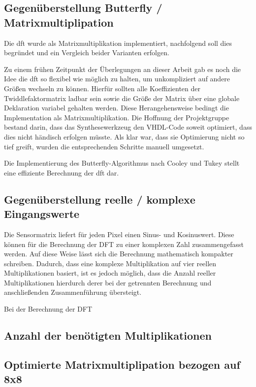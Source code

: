   \subsection{Gegenüberstellung Butterfly / Matrixmultiplipation} 
  Die \gls{dft} wurde als Matrixmultiplikation implementiert, nachfolgend soll dies begründet und ein Vergleich beider Varianten erfolgen.
  
  Zu einem frühen Zeitpunkt der Überlegungen 
  an dieser Arbeit gab es noch die Idee die \gls{dft} so flexibel wie möglich zu halten, um unkompliziert auf andere Größen wechseln zu können.
  Hierfür sollten alle Koeffizienten der Twiddlefaktormatrix ladbar sein sowie die Größe der Matrix über eine globale Deklaration variabel gehalten werden.
  Diese Herangehensweise bedingt die Implementation als Matrixmultiplikation. Die Hoffnung der Projektgruppe bestand darin, dass das Synthesewerkzeug den 
  VHDL-Code soweit optimiert, dass dies nicht händisch erfolgen müsste.
  Als klar war, dass sie Optimierung nicht so tief greift, wurden die entsprechenden Schritte manuell umgesetzt. 
  
  Die Implementierung des Butterfly-Algorithmus nach Cooley und Tukey stellt eine effiziente Berechnung der \gls{dft} dar. 
  
  
  \subsection{Gegenüberstellung reelle / komplexe Eingangswerte}
  Die Sensormatrix liefert für jeden Pixel einen Sinus- und Kosinuswert. Diese können für die Berechnung der DFT zu einer komplexen Zahl zusammengefasst werden. 
  Auf diese Weise lässt sich die Berechnung mathematisch kompakter schreiben. Dadurch, dass eine komplexe Multiplikation auf vier reellen Multiplikationen basiert,
  ist es jedoch möglich, dass die Anzahl reeller Multiplikationen hierdurch derer bei der getrennten Berechnung und anschließenden Zusammenführung übersteigt.
  
  Bei der Berechnung der DFT 
 
  
 \subsection{Anzahl der benötigten Multiplikationen}
 \subsection{Optimierte Matrixmultiplipation bezogen auf 8x8}